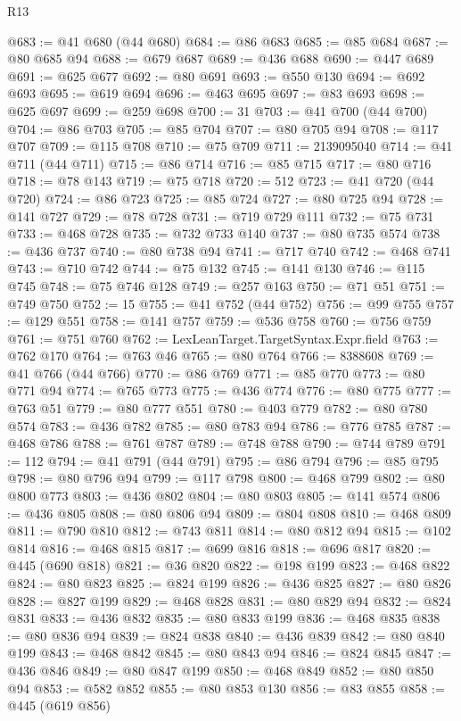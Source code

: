 \begin{lexlean}{R13}
\begin{coremodule}
@683 := @41 @680 (@44 @680)
@684 := @86 @683
@685 := @85 @684
@687 := @80 @685 @94
@688 := @679 @687
@689 := @436 @688
@690 := @447 @689
@691 := @625 @677
@692 := @80 @691
@693 := @550 @130
@694 := @692 @693
@695 := @619 @694
@696 := @463 @695
@697 := @83 @693
@698 := @625 @697
@699 := @259 @698
@700 := 31
@703 := @41 @700 (@44 @700)
@704 := @86 @703
@705 := @85 @704
@707 := @80 @705 @94
@708 := @117 @707
@709 := @115 @708
@710 := @75 @709
@711 := 2139095040
@714 := @41 @711 (@44 @711)
@715 := @86 @714
@716 := @85 @715
@717 := @80 @716
@718 := @78 @143
@719 := @75 @718
@720 := 512
@723 := @41 @720 (@44 @720)
@724 := @86 @723
@725 := @85 @724
@727 := @80 @725 @94
@728 := @141 @727
@729 := @78 @728
@731 := @719 @729 @111
@732 := @75 @731
@733 := @468 @728
@735 := @732 @733 @140
@737 := @80 @735 @574
@738 := @436 @737
@740 := @80 @738 @94
@741 := @717 @740
@742 := @468 @741
@743 := @710 @742
@744 := @75 @132
@745 := @141 @130
@746 := @115 @745
@748 := @75 @746 @128
@749 := @257 @163
@750 := @71 @51
@751 := @749 @750
@752 := 15
@755 := @41 @752 (@44 @752)
@756 := @99 @755
@757 := @129 @551
@758 := @141 @757
@759 := @536 @758
@760 := @756 @759
@761 := @751 @760
@762 := LexLeanTarget.TargetSyntax.Expr.field
@763 := @762 @170
@764 := @763 @46
@765 := @80 @764
@766 := 8388608
@769 := @41 @766 (@44 @766)
@770 := @86 @769
@771 := @85 @770
@773 := @80 @771 @94
@774 := @765 @773
@775 := @436 @774
@776 := @80 @775
@777 := @763 @51
@779 := @80 @777 @551
@780 := @403 @779
@782 := @80 @780 @574
@783 := @436 @782
@785 := @80 @783 @94
@786 := @776 @785
@787 := @468 @786
@788 := @761 @787
@789 := @748 @788
@790 := @744 @789
@791 := 112
@794 := @41 @791 (@44 @791)
@795 := @86 @794
@796 := @85 @795
@798 := @80 @796 @94
@799 := @117 @798
@800 := @468 @799
@802 := @80 @800 @773
@803 := @436 @802
@804 := @80 @803
@805 := @141 @574
@806 := @436 @805
@808 := @80 @806 @94
@809 := @804 @808
@810 := @468 @809
@811 := @790 @810
@812 := @743 @811
@814 := @80 @812 @94
@815 := @102 @814
@816 := @468 @815
@817 := @699 @816
@818 := @696 @817
@820 := @445 (@690 @818)
@821 := @36 @820
@822 := @198 @199
@823 := @468 @822
@824 := @80 @823
@825 := @824 @199
@826 := @436 @825
@827 := @80 @826
@828 := @827 @199
@829 := @468 @828
@831 := @80 @829 @94
@832 := @824 @831
@833 := @436 @832
@835 := @80 @833 @199
@836 := @468 @835
@838 := @80 @836 @94
@839 := @824 @838
@840 := @436 @839
@842 := @80 @840 @199
@843 := @468 @842
@845 := @80 @843 @94
@846 := @824 @845
@847 := @436 @846
@849 := @80 @847 @199
@850 := @468 @849
@852 := @80 @850 @94
@853 := @582 @852
@855 := @80 @853 @130
@856 := @83 @855
@858 := @445 (@619 @856)

\end{coremodule}
\end{lexlean}
